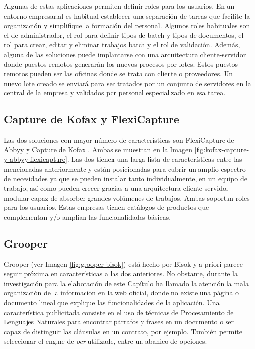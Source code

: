Algunas de estas aplicaciones permiten definir roles para los usuarios. En un entorno empresarial es habitual establecer una separación de tareas que facilite la organización y simplifique la formación del personal. Algunos roles habituales son el de administrador, el rol para definir tipos de batch y tipos de documentos, el rol para crear, editar y eliminar trabajos batch y el rol de validación. Además, alguna de las soluciones puede implantarse con una arquitectura cliente-servidor donde puestos remotos generarán los nuevos procesos por lotes. Estos puestos remotos pueden ser las oficinas donde se trata con cliente o proveedores. Un nuevo lote creado se enviará para ser tratados por un conjunto de servidores en la central de la empresa y validados por personal especializado en esa tarea.

\subsection{Capture de Kofax y FlexiCapture}

Las dos soluciones con mayor número de características son FlexiCapture de Abbyy \cite{solucionesComerciales_abbyy_flexicapture4invoices} y Capture de Kofax \cite{solucionesComerciales_kofax_capture}. Ambas se muestran en la Imagen \ref{fig:kofax-capture-y-abbyy-flexicapture}. Las dos tienen una larga lista de características entre las mencionadas anteriormente y están posicionadas para cubrir un amplio espectro de necesidades ya que se pueden instalar tanto individualmente, en un equipo de trabajo, así como pueden crecer gracias a una arquitectura cliente-servidor modular capaz de absorber grandes volúmenes de trabajos. Ambas soportan roles para los usuarios. Estas empresas tienen catálogos de productos que complementan y/o amplían las funcionalidades básicas.

\subsection{Grooper}

Grooper \cite{solucionesComerciales_bisok_grooper} (ver Imagen \ref{fig:grooper-bisok}) está hecho por Bisok y a priori parece seguir próxima en características a las dos anteriores. No obstante, durante la investigación para la elaboración de este Capítulo ha llamado la atención la mala organización de la información en la web oficial, donde no existe una página o documento lineal que explique las funcionalidades de la aplicación. Una característica publicitada consiste en el uso de técnicas de Procesamiento de Lenguajes Naturales para encontrar párrafos y frases en un documento o ser capaz de distinguir las cláusulas en un contrato, por ejemplo. También permite seleccionar el engine de \emph{\acrlong{ocr}} utilizado, entre un abanico de opciones.


